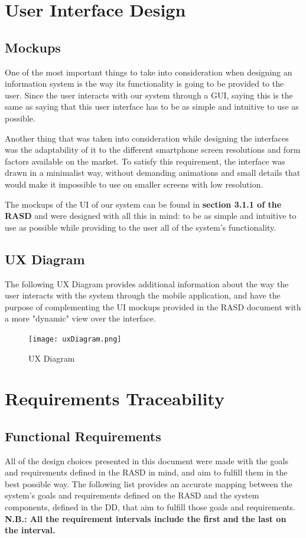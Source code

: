 \documentclass[12pt]{article}
\begin{document}
\section{User Interface Design}
\subsection{Mockups}
One of the most important things to take into consideration when designing an information system is the way its functionality is going to be provided to the user. Since the user interacts with our system through a GUI, saying this is the same as saying that this user interface has to be as simple and intuitive to use as possible.

Another thing that was taken into consideration while designing the interfaces was the adaptability of it to the different smartphone screen resolutions and form factors available on the market. To satisfy this requirement, the interface was drawn in a minimalist way, without demanding animations and small details that would make it impossible to use on smaller screens with low resolution.

The mockups of the UI of our system can be found in \textbf{section 3.1.1 of the RASD} and were designed with all this in mind: to be as simple and intuitive to use as possible while providing to the user all of the system's functionality.

\subsection{UX Diagram}
The following UX Diagram provides additional information about the way the user interacts with the system through the mobile application, and have the purpose of complementing the UI mockups provided in the RASD document with a more "dynamic" view over the interface.

\begin{figure}[H]
    \centering
    \texttt{[image: uxDiagram.png]}
    \caption{UX Diagram}
    \label{fig:uxDiagram}
\end{figure}

\section{Requirements Traceability}
\subsection{Functional Requirements}
All of the design choices presented in this document were made with the goals and requirements defined in the RASD in mind, and aim to fulfill them in the best possible way. The following list provides an accurate mapping between the system's goals and requirements defined on the RASD and the system components, defined in the DD, that aim to fulfill those goals and requirements.\\
\textbf{N.B.: All the requirement intervals include the first and the last on the interval.}
\end{document}
